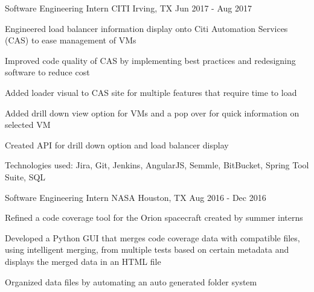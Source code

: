 

\begin{cventries}


      
  \cventry
    {Software Engineering Intern} %
    {CITI} %
    {Irving, TX} %
    {Jun 2017 - Aug 2017} %
    {
      \begin{cvitems} %
        \item {Engineered load balancer information display onto Citi Automation Services (CAS) to ease management of VMs}
        \item {Improved code quality of CAS by implementing best practices and redesigning software to reduce cost}
        \item {Added loader visual to CAS site for multiple features that require time to load}
        \item {Added drill down view option for VMs and a pop over for quick information on selected VM}
        \item{Created API for drill down option and load balancer display}
        \item {Technologies used: Jira, Git, Jenkins, AngularJS, Semmle, BitBucket, Spring Tool Suite, SQL }
      \end{cvitems}
    }

  \cventry
    {Software Engineering Intern} %
    {NASA} %
    {Houston, TX} %
    {Aug 2016 - Dec 2016} %
    {
      \begin{cvitems} %
        \item {Refined a code coverage tool for the Orion spacecraft created by summer interns }
        \item {Developed a Python GUI that merges code coverage data with compatible files, using intelligent merging, from multiple tests based on certain metadata and displays the merged data in an HTML file}
        \item {Organized data files by automating an auto generated folder system}
      \end{cvitems}
    }


\end{cventries}
